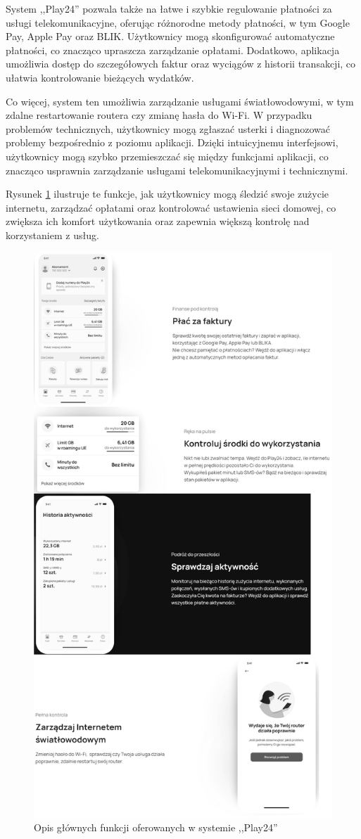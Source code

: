 System ,,Play24'' pozwala także na łatwe i szybkie regulowanie płatności za usługi telekomunikacyjne, oferując różnorodne metody płatności, w tym Google Pay, Apple Pay oraz BLIK. Użytkownicy mogą skonfigurować automatyczne płatności, co znacząco upraszcza zarządzanie opłatami. Dodatkowo, aplikacja umożliwia dostęp do szczegółowych faktur oraz wyciągów z historii transakcji, co ułatwia kontrolowanie bieżących wydatków.

Co więcej, system ten umożliwia zarządzanie usługami światłowodowymi, w tym zdalne restartowanie routera czy zmianę hasła do Wi-Fi. W przypadku problemów technicznych, użytkownicy mogą zgłaszać usterki i diagnozować problemy bezpośrednio z poziomu aplikacji. Dzięki intuicyjnemu interfejsowi, użytkownicy mogą szybko przemieszczać się między funkcjami aplikacji, co znacząco usprawnia zarządzanie usługami telekomunikacyjnymi i technicznymi.

Rysunek \ref{fig:play24_manual} ilustruje te funkcje, jak użytkownicy mogą śledzić swoje zużycie internetu, zarządzać opłatami oraz kontrolować ustawienia sieci domowej, co zwiększa ich komfort użytkowania oraz zapewnia większą kontrolę nad korzystaniem z usług.

\begin{figure}[ht]
    \centering
    \includegraphics[width=0.6\linewidth]{zrzuty_ekranu/play_manual}
    \caption{Opis głównych funkcji oferowanych w systemie ,,Play24''}
    \label{fig:play24_manual}
\end{figure}

